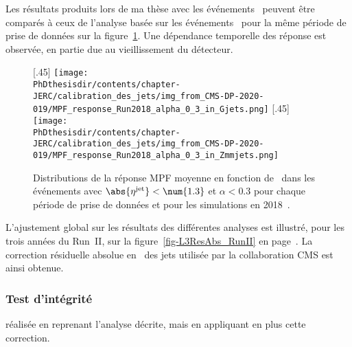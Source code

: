 \par Les résultats produits lors de ma thèse avec les événements \Gjets\ peuvent être comparés à ceux de l'analyse basée sur les événements \Zmmjets\ pour la même période de prise de données sur la figure~\ref{fig-chapter-JERC-section-JES-subsec-results-response_eta0013_alpha_0_3_2018}.
Une dépendance temporelle des réponse est observée, en partie due au vieillissement du détecteur.
\begin{figure}[h]
\centering
{}[.45\textwidth]
{\texttt{[image: \\PhDthesisdir/contents/chapter-JERC/calibration\_des\_jets/img\_from\_CMS-DP-2020-019/MPF\_response\_Run2018\_alpha\_0\_3\_in\_Gjets.png]}}
\hfill
{}[.45\textwidth]
{\texttt{[image: \\PhDthesisdir/contents/chapter-JERC/calibration\_des\_jets/img\_from\_CMS-DP-2020-019/MPF\_response\_Run2018\_alpha\_0\_3\_in\_Zmmjets.png]}}
\caption[Distributions de la réponse MPF moyenne en fonction de \pT\ en 2018.]{Distributions de la réponse MPF moyenne en fonction de \pT\ dans les événements avec $\abs{\eta^\text{jet}}<\num{1.3}$ et $\alpha<\num{0.3}$ pour chaque période de prise de données et pour les simulations en 2018~\cite{CMS-DP-2020-019}.}
\label{fig-chapter-JERC-section-JES-subsec-results-response_eta0013_alpha_0_3_2018}
\end{figure}
\par L'ajustement global sur les résultats des différentes analyses est illustré, pour les trois années du Run~II, sur la figure~\ref{fig-L3ResAbs_RunII} en page~\pageref{fig-L3ResAbs_RunII}.
La correction résiduelle absolue en \pT\ des jets utilisée par la collaboration CMS est ainsi obtenue.
\subsubsection{Test d'intégrité}\label{chapter-JERC-section-JES-subsec-results-subsubsec-L2L3Res_cross_check}
réalisée en reprenant l'analyse décrite, mais en appliquant en plus cette correction.
